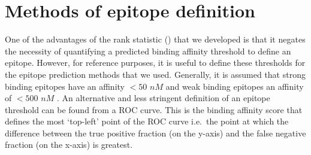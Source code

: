 %
%
%
%
%
%
%

\section{Methods of epitope definition}\label{appendixc/EpiDefine}

One of the advantages of the rank statistic () that we developed is that it negates the necessity of quantifying a predicted binding affinity threshold to define an epitope. However, for reference purposes, it is useful to define these thresholds for the epitope prediction methods that we used. Generally, it is assumed that strong binding epitopes have an affinity $< 50$ $nM$ and weak binding epitopes an affinity of $< 500$ $nM$ \citep{buus2003}. An alternative and less stringent definition of an epitope threshold can be found from a ROC curve. This is the binding affinity score that defines the most `top-left' point of the ROC curve i.e.~the point at which the difference between the true positive fraction (on the y-axis) and the false negative fraction (on the x-axis) is greatest.

